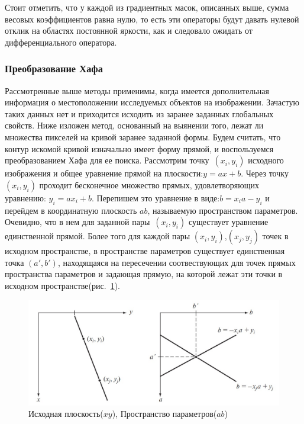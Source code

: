 \documentclass[12pt]{article} %
\begin{document}
Стоит отметить, что у каждой из градиентных масок, описанных выше, сумма весовых коэффициентов равна нулю, то есть эти операторы будут давать нулевой отклик на областях постоянной яркости, как и следовало ожидать от дифференциального оператора.

\subsubsection{Преобразование Хафа}

Рассмотренные выше методы применимы, когда имеется дополнительная информация о местоположении исследуемых объектов на изображении. Зачастую таких данных нет и приходится исходить из заранее заданных глобальных свойств. Ниже изложен метод, основанный на выянении того, лежат ли множества пикселей на кривой заранее заданной формы.
Будем считать, что контур искомой кривой изначально имеет форму прямой, и воспользуемся преобразованием Хафа для ее поиска.
Рассмотрим точку~$(x_i, y_i)$ исходного изображения и общее уравнение прямой на плоскости:$y = ax+b$. Через точку~$(x_i, y_i)$ проходит бесконечное множество прямых, удовлетворяющих уравнению: $y_i = ax_i+b$. Перепишем это уравнение в виде:$b = x_i a - y_i$ и перейдем в координатную плоскость $ab$, называемую пространством параметров. Очевидно, что в нем для заданной пары~$(x_i, y_i)$ существует уравнение единственной прямой. Более того для каждой пары $(x_i, y_i)$,$(x_j, y_j)$ точек в исходном пространстве, в пространстве параметров существует единственная точка $(a', b')$, находящаяся на пересечении соотвествующих для точек прямых пространства параметров и задающая прямую, на которой лежат эти точки в исходном пространстве(рис.~\ref{fig:param_haf}).

\begin{figure}[h]
	
	\centering
	
	\includegraphics[width=0.6\linewidth]{param_haf.jpg}
	
	\caption{Исходная плоскость($xy$), Пространство параметров($ab$)}
	
	\label{fig:param_haf}
	
\end{figure}
\end{document}
